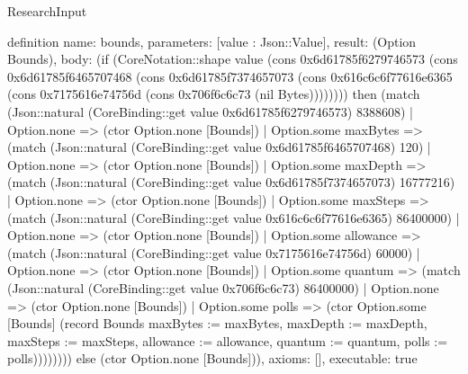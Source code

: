 \begin{lexlean}{ResearchInput}
\begin{semanticmodule}
definition{
 name: bounds,
 parameters: [value : Json::Value],
 result: (Option Bounds),
 body: (if (CoreNotation::shape value (cons 0x6d61785f6279746573 (cons 0x6d61785f6465707468 (cons 0x6d61785f7374657073 (cons 0x616c6c6f77616e6365 (cons 0x7175616e74756d (cons 0x706f6c6c73 (nil Bytes)))))))) then (match (Json::natural (CoreBinding::get value 0x6d61785f6279746573) 8388608) | Option.none => (ctor Option.none [Bounds]) | Option.some maxBytes => (match (Json::natural (CoreBinding::get value 0x6d61785f6465707468) 120) | Option.none => (ctor Option.none [Bounds]) | Option.some maxDepth => (match (Json::natural (CoreBinding::get value 0x6d61785f7374657073) 16777216) | Option.none => (ctor Option.none [Bounds]) | Option.some maxSteps => (match (Json::natural (CoreBinding::get value 0x616c6c6f77616e6365) 86400000) | Option.none => (ctor Option.none [Bounds]) | Option.some allowance => (match (Json::natural (CoreBinding::get value 0x7175616e74756d) 60000) | Option.none => (ctor Option.none [Bounds]) | Option.some quantum => (match (Json::natural (CoreBinding::get value 0x706f6c6c73) 86400000) | Option.none => (ctor Option.none [Bounds]) | Option.some polls => (ctor Option.some [Bounds] (record Bounds {maxBytes := maxBytes, maxDepth := maxDepth, maxSteps := maxSteps, allowance := allowance, quantum := quantum, polls := polls})))))))) else (ctor Option.none [Bounds])),
 axioms: [],
 executable: true
}


\end{semanticmodule}
\end{lexlean}
